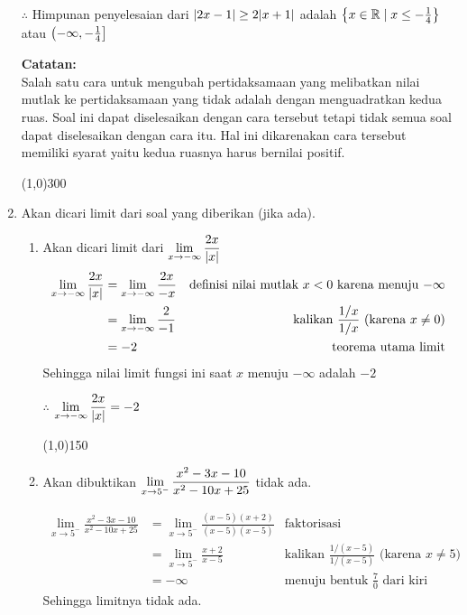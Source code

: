 \begin{enumerate}[leftmargin=*, label={\arabic*}.]
$\therefore$ Himpunan penyelesaian dari $\abs{2x-1} \geq 2\abs{x+1}$
adalah $\set*{x \in \mathbb{R} \mid x \leq -\frac{1}{4}}$
atau $\oic*{-\infty,-\frac{1}{4}}$

\vspace{0.1cm}
\textbf{Catatan:}\\
Salah satu cara untuk mengubah pertidaksamaan yang melibatkan nilai mutlak ke 
pertidaksamaan yang tidak adalah dengan menguadratkan kedua ruas. Soal ini 
dapat diselesaikan dengan cara tersebut tetapi tidak semua soal dapat 
diselesaikan dengan cara itu. Hal ini dikarenakan cara tersebut memiliki syarat 
yaitu kedua ruasnya harus bernilai positif.
\begin{center}
    \line(1,0){300}
\end{center}
\item Akan dicari limit dari soal yang diberikan (jika ada).
\begin{enumerate}[label={\alph*}.]
    \item Akan dicari limit dari 
    $\ds \lim_{x\to -\infty} \frac{2x}{\abs{x}}$
    \begin{align*}
        \lim_{x\to -\infty} \frac{2x}{\abs{x}} 
        &= \lim_{x\to -\infty} \frac{2x}{-x}
        &\text{definisi nilai mutlak $x < 0$ karena menuju $-\infty$}\\
        &= \lim_{x\to -\infty} \frac{2}{-1}
        &\text{kalikan $\frac{1/x}{1/x}$ (karena $x \neq 0$)}\\
        &= -2
        &\text{teorema utama limit}
    \end{align*}
    Sehingga nilai limit fungsi ini saat $x$ menuju $-\infty$ adalah $-2$

    $\therefore$ $\ds \lim_{x\to -\infty} \frac{2x}{\abs{x}} = -2$
\begin{center}
    \line(1,0){150}
\end{center}
    \item Akan dibuktikan 
    $\ds \lim_{x\to 5^{-}} \frac{x^{2}-3x-10}{x^{2}-10x+25}$ tidak ada.

    \begin{align*}
        \lim_{x\to 5^{-}} \frac{x^{2}-3x-10}{x^{2}-10x+25} 
        &= \lim_{x\to 5^{-}} \frac{(x-5)(x+2)}{(x-5)(x-5)}
        &\text{faktorisasi}\\
        &= \lim_{x\to 5^{-}} \frac{x+2}{x-5}
        &\text{kalikan $\frac{1/(x-5)}{1/(x-5)}$ (karena $x \neq 5$)}\\
        &= -\infty
        &\text{menuju bentuk $\frac{7}{0}$ dari kiri}
    \end{align*}
    Sehingga limitnya tidak ada.


\end{enumerate}
\end{enumerate}
